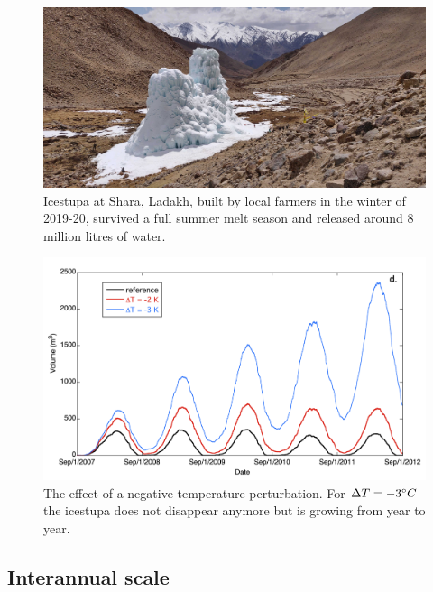 \begin{figure}[htb]
  \centering
	\includegraphics[width=\textwidth]{figs/PIR_example.jpg}

  \caption{Icestupa at Shara, Ladakh, built by local farmers in the winter of 2019-20, survived a full summer melt season and released
  around 8 million litres of water.} 

\label{fig:PIR} 
\end{figure}

\begin{figure}[htb]
  \centering
	\includegraphics[width=\textwidth]{figs/PIR_evolution.png}
  \caption{The effect of a negative temperature perturbation. For $\Delta T = -3 ^{\circ} C$ the icestupa does
  not disappear anymore but is growing from year to year.}
\label{fig:PIR_evolution}
\end{figure}



\subsection{Interannual scale}
\label{sec:interannual}

